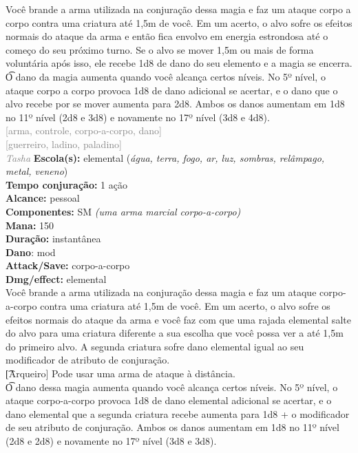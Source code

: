 \documentclass{RPG_Adventure}[2021/10/20]
\begin{document}
{\normalsize Você brande a arma utilizada na conjuração dessa magia e faz um ataque corpo a corpo contra uma criatura até 1,5m de você. Em um acerto, o alvo sofre os efeitos normais do ataque da arma e então fica envolvo em energia estrondosa até o começo do seu próximo turno. Se o alvo se mover 1,5m ou mais de forma voluntária após isso, ele recebe 1d8 de dano do seu elemento e a magia se encerra.\\\t O dano da magia aumenta quando você alcança certos níveis. No 5º nível, o ataque corpo a corpo provoca 1d8 de dano adicional se acertar, e o dano que o alvo recebe por se mover aumenta para 2d8. Ambos os danos aumentam em 1d8 no 11º nível (2d8 e 3d8) e novamente no 17º nível (3d8 e 4d8).\\}
{\scriptsize \textcolor{gray}{[arma, controle, corpo-a-corpo, dano]\\}}
{\scriptsize \textcolor{gray}{[guerreiro, ladino, paladino]\\}}
{\tiny \textcolor{gray}{\textit{Tasha}}}\jump{}
{\small \t \textbf{Escola(s):} elemental (\textit{água, terra, fogo, ar, luz, sombras, relâmpago, metal, veneno})\\\t \textbf{Tempo conjuração:} 1 ação\\\t \textbf{Alcance:} pessoal\\\t \textbf{Componentes:} SM \textit{(uma arma marcial corpo-a-corpo)}\\\t \textbf{Mana:} 150\\\t \textbf{Duração:} instantânea\\\t \textbf{Dano}: mod\\\t \textbf{Attack/Save:} corpo-a-corpo\\\t \textbf{Dmg/effect:} elemental\\}
{\normalsize Você brande a arma utilizada na conjuração dessa magia e faz um ataque corpo-a-corpo contra uma criatura até 1,5m de você. Em um acerto, o alvo sofre os efeitos normais do ataque da arma e você faz com que uma rajada elemental salte do alvo para uma criatura diferente a sua escolha que você possa ver a até 1,5m do primeiro alvo. A segunda criatura sofre dano elemental igual ao seu modificador de atributo de conjuração.\\\t [Arqueiro] Pode usar uma arma de ataque à distância.\\\t O dano dessa magia aumenta quando você alcança certos níveis. No 5º nível, o ataque corpo-a-corpo provoca 1d8 de dano elemental adicional se acertar, e o dano elemental que a segunda criatura recebe aumenta para 1d8 + o modificador de seu atributo de conjuração. Ambos os danos aumentam em 1d8 no 11º nível (2d8 e 2d8) e novamente no 17º nível (3d8 e 3d8).\\}
\end{document}
